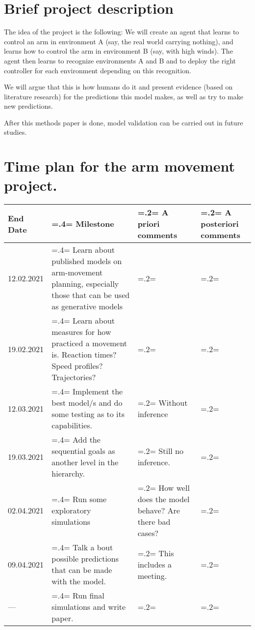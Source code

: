 \documentclass{report}
\begin{document}
\section*{Brief project description}
The idea of the project is the following: We will create an agent that learns to control an arm in environment A (say, the real world carrying nothing), and learns how to control the arm in environment B (say, with high winds). The agent then learns to recognize environments A and B and to deploy the right controller for each environment depending on this recognition.

We will argue that this is how humans do it and present evidence (based on literature research) for the predictions this model makes, as well as try to make new predictions.

After this methods paper is done, model validation can be carried out in future studies.


\section*{Time plan for the arm movement project.}

\begin{tabularx}{\textwidth}{
  l|
  >{\hsize=.4\hsize\linewidth=\hsize}X|
  >{\hsize=.2\hsize\linewidth=\hsize}X|
  >{\hsize=.2\hsize\linewidth=\hsize}X}
End Date & Milestone & A priori comments & A posteriori comments \\ \hline \hline
12.02.2021 & Learn about published models on arm-movement planning, especially those that can be used as generative models & & \\ \hline
19.02.2021 & Learn about measures for how practiced a movement is. Reaction times? Speed profiles? Trajectories? & & \\\hline
12.03.2021 & Implement the best model/s and do some testing as to its capabilities. & Without inference &   \\ \hline
19.03.2021 & Add the sequential goals as another level in the hierarchy. & Still no inference. & \\ \hline
02.04.2021 & Run some exploratory simulations & How well does the model behave? Are there bad cases? & \\ \hline
09.04.2021 & Talk a  bout possible predictions that can be made with the model. & This includes a meeting. & \\ \hline
--- & Run final simulations and write paper. & & \\ \hline

\end{tabularx}
\end{document}
